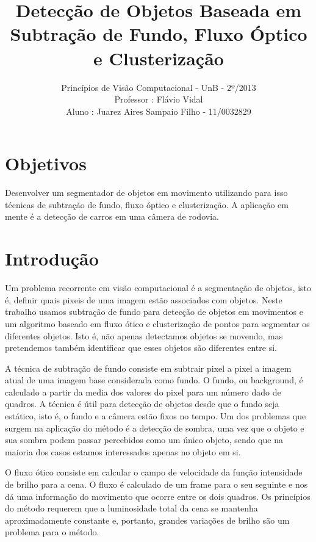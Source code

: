 \documentclass[journal]{IEEEtran}
\begin{document}
\title{ 
Detecção de Objetos Baseada em Subtração de Fundo, Fluxo Óptico e 
Clusterização}
\author{
		Princípios de Visão Computacional - UnB - 2º/2013 \\
		Professor : Flávio Vidal \\
		Aluno : Juarez Aires Sampaio Filho - 11/0032829 \\
		}


\maketitle
\IEEEpeerreviewmaketitle

\section{Objetivos} 
Desenvolver um segmentador de objetos em movimento utilizando para 
isso técnicas de subtração de fundo, fluxo óptico e clusterização.
A aplicação em mente é a detecção de carros em uma câmera de rodovia.
\section{Introdução}
    Um problema recorrente em visão computacional é 
a segmentação de objetos, isto é, definir quais pixeis de uma
imagem estão associados com objetos. Neste trabalho usamos subtração
de fundo para detecção de objetos em movimentos e um algoritmo baseado
em fluxo ótico e clusterização de pontos para segmentar os diferentes 
objetos. Isto é, não apenas detectamos objetos se movendo, mas 
pretendemos também identificar que esses objetos são diferentes 
entre si.

    A técnica de subtração de fundo consiste em subtrair pixel a 
pixel a imagem atual de uma imagem base considerada como fundo.
O fundo, ou background, é calculado a partir da media dos valores do 
pixel para um número dado de quadros. A técnica é útil para detecção 
de objetos desde que o fundo seja estático, isto é, o fundo e a câmera
estão fixos no tempo. Um dos problemas que surgem na aplicação do 
método é a detecção de sombra, uma vez que o objeto e sua sombra 
podem passar percebidos como um único objeto, sendo que na maioria 
dos casos estamos interessados apenas no objeto em si.

    O fluxo ótico consiste em calcular o campo de velocidade da 
função intensidade de brilho para a cena. O fluxo é calculado de um 
frame para o seu seguinte e nos dá uma informação do movimento que 
ocorre entre os dois quadros. Os princípios do método requerem que a 
luminosidade total da cena se mantenha aproximadamente constante e, 
portanto, grandes variações de brilho são um problema para o método.
\end{document}
